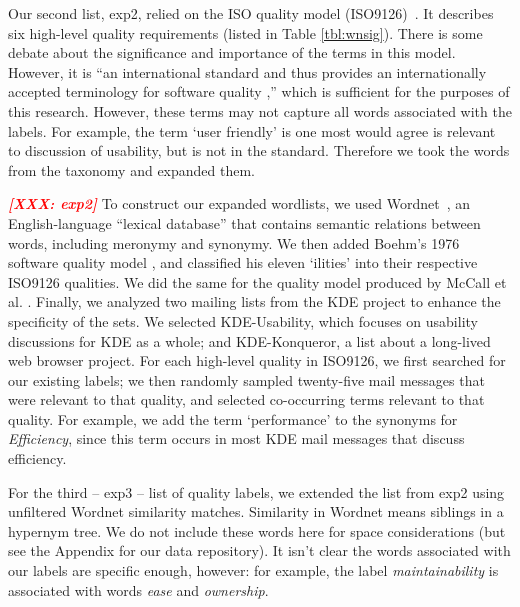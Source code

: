 \documentclass{acm_proc_article-sp}
\newcommand{\XXX}[1]{\textcolor{red}{{\it \textbf{[XXX: #1]}}}}
\begin{document}
Our second list, \textsf{exp2}, relied on the ISO quality model (ISO9126)~\cite{iso9126}. It describes six high-level quality requirements (listed in Table \ref{tbl:wnsig}). There is some debate about the significance and importance of the terms in this model. However, it is ``an international standard and thus provides an internationally accepted terminology for software quality \cite[p. 58]{Bøegh2008},'' which is sufficient for the purposes of this research. However, these terms may not capture all words associated with the labels.  For example, the term ‘user friendly’ is one most would agree is relevant to discussion of usability, but is not in the standard. Therefore we took the words from the taxonomy and expanded them.


\XXX{exp2}
To construct our expanded wordlists, we used Wordnet~\cite{Fellbaum1998}, an English-language ``lexical database'' that contains semantic relations between words, including meronymy and synonymy. We then added Boehm’s 1976 software quality model \cite{Boehm+:1976:ICSE}, and classified his eleven ‘ilities’ into their respective ISO9126 qualities. We did the same for the quality model produced by McCall et al. \cite{mccall1977}. Finally, we analyzed two mailing lists from the KDE project to enhance the specificity of the sets. We selected KDE-Usability, which focuses on usability discussions for KDE as a whole; and KDE-Konqueror, a list about a long-lived web browser project. For each high-level quality in ISO9126, we first searched for our existing labels; we then randomly sampled twenty-five mail messages that were relevant to that quality, and selected co-occurring terms relevant to that quality. For example, we add the term ‘performance’ to the synonyms for \emph{Efficiency}, since this term occurs in most KDE mail messages that discuss efficiency.

For the third -- \textsf{exp3} -- list of quality labels, we extended the list from \textsf{exp2} using unfiltered Wordnet similarity matches. Similarity in Wordnet means siblings in a hypernym tree. We do not include these words here for space considerations (but see the Appendix for our data repository). It isn't clear the words associated with our labels are specific enough, however: for example, the label \emph{maintainability} is associated with words \emph{ease} and \emph{ownership}.
\end{document}
